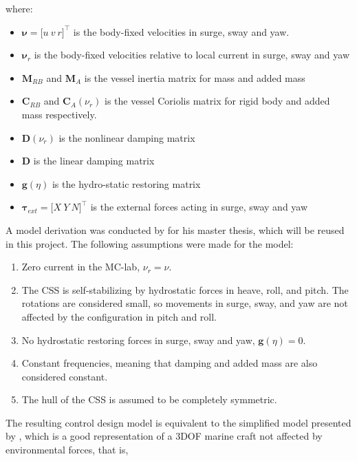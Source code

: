 where:

\begin{itemize}
    \item $ \boldsymbol{\nu} = \big[ u \ v  \ r \big]^{\top}$ is the body-fixed velocities in surge, sway and yaw.
    \item $\boldsymbol{\nu}_r$ is the body-fixed velocities relative to local current in surge, sway and yaw
    \item $\mathbf{M}_{RB}$ and $\mathbf{M}_A$ is the vessel inertia matrix for mass and added mass
    \item $\mathbf{C}_{RB}$ and $\mathbf{C}_A(\nu_r)$ is the vessel Coriolis matrix for rigid body and added mass respectively. 
    \item $\mathbf{D}(\nu_r)$ is the nonlinear damping matrix
    \item $\mathbf{D}$ is the linear damping matrix
    \item $\mathbf{g}(\eta)$ is the hydro-static restoring matrix
    \item $\boldsymbol{\tau}_{ext} = \big[ X \ Y  \ N \big]^{\top}$ is the external forces acting in surge, sway and yaw
\end{itemize}

A model derivation was conducted by \citet{ueland} for his master thesis, which will be reused in this project. The following assumptions were made for the model: 

\begin{enumerate}
    \item Zero current in the MC-lab, $\nu_r = \nu$.
    \item The CSS is self-stabilizing by hydrostatic forces in heave, roll, and pitch. The rotations are considered small, so movements in surge, sway, and yaw are not affected by the configuration in pitch and roll. 
    \item No  hydrostatic restoring forces in surge, sway and yaw, $\mathbf{g}(\eta) = 0$.
    \item Constant frequencies, meaning that damping and added mass are also considered constant.
    \item The hull of the CSS is assumed to be completely symmetric.
\end{enumerate}

The resulting control design model is equivalent to the simplified model presented by \citet{fossen_2021}, which is a good representation of a 3DOF marine craft not affected by environmental forces, that is,

